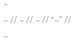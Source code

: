 \documentclass[12pt,paper=a4]{scrartcl}
\begin{document}
…


\ex \begingl
	\glpreamble … //
	\gla … //
	\glb … //
	\glft \enquote{…} //
\endgl \xe

…


\printbibliography
\end{document}
